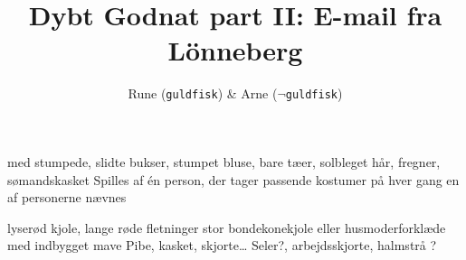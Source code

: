 \documentclass[danish]{article}
\title{Dybt Godnat part II: E-mail fra L\"onneberg}
\author{Rune (\texttt{guldfisk}) \& Arne ($\neg$\texttt{guldfisk})}
\begin{document}
\maketitle
\vskip -1cm

\begin{roles}
   med stumpede, slidte bukser, stumpet bluse, bare tæer,
  solbleget hår, fregner, sømandskasket
   Spilles af én person, der
  tager passende kostumer på hver gang en af personerne nævnes
\end{roles}
\vskip-5mm

\begin{props}
     lyserød kjole, lange røde fletninger
     stor bondekonekjole eller husmoderforklæde med
    indbygget mave
     Pibe, kasket, skjorte\ldots
     Seler?, arbejdsskjorte, halmstrå
     ?
  \end{props}
\vspace{-1cm}
\end{document}
